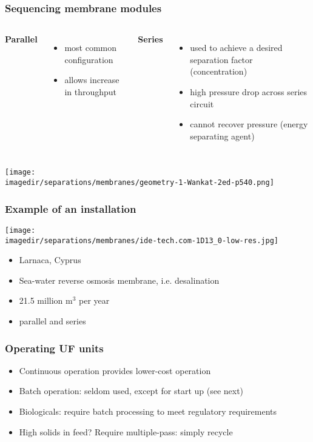 \begin{frame}\frametitle{Sequencing membrane modules}
	\begin{columns}[t]
			\textbf{Parallel}
			\begin{itemize}
				\item	most common configuration
				\item	allows increase in throughput
			\end{itemize}
			\textbf{Series}
			\begin{itemize}
				\item	used to achieve a desired separation factor (concentration)
				\item	high pressure drop across series circuit
				\item	cannot recover pressure (energy separating agent)
			\end{itemize}
	\end{columns}
	\begin{center}
		\texttt{[image: \\imagedir/separations/membranes/geometry-1-Wankat-2ed-p540.png]}
	\end{center}
\end{frame}

\begin{frame}\frametitle{Example of an installation}
	\texttt{[image: \\imagedir/separations/membranes/ide-tech.com-1D13\_0-low-res.jpg]}
	\begin{itemize}
		\item	Larnaca, Cyprus
		\item	Sea-water reverse osmosis membrane, i.e. desalination
		\item	21.5 million $\text{m}^3$ per year
		\item	parallel and series
	\end{itemize}
\end{frame}

\begin{frame}\frametitle{Operating UF units}
	\begin{itemize}
		\item	Continuous operation provides lower-cost operation
		\item	Batch operation: seldom used, except for start up (see next)
		\item	Biologicals: require batch processing to meet regulatory requirements
		\item	High solids in feed? Require multiple-pass: simply recycle
	\end{itemize}

\end{frame}

